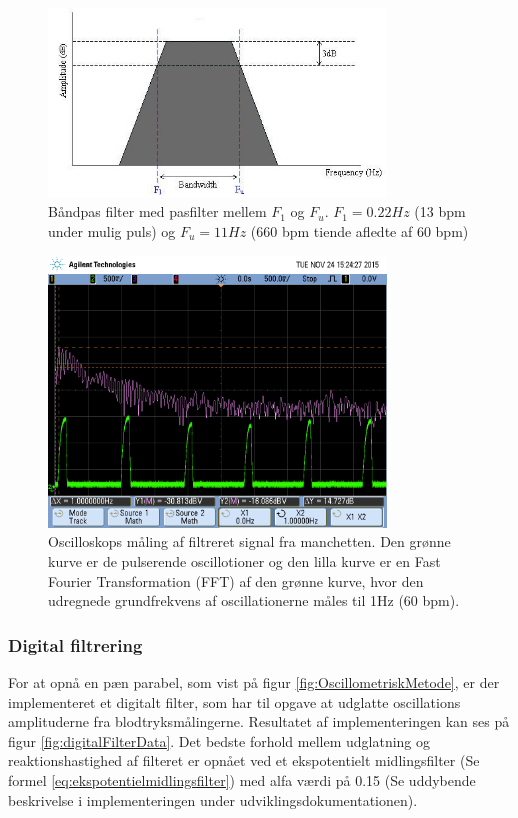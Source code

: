 \begin{figure}[H]
	\centering
	\includegraphics[trim={0 0 0 1.5cm},clip, width=0.8\textwidth]{billeder/BandPass_filter.JPG}
	\caption{Båndpas filter med pasfilter mellem $F_1$ og $F_u$. $F_1=0.22Hz$ (13 bpm under mulig puls) og $F_u=11Hz$ (660 bpm tiende afledte af 60 bpm) }\label{fig:BandPassFilter}
\end{figure}

\begin{figure}[H]
	\centering
	\includegraphics[trim={0 2.5cm 0 1.5cm},clip, width=0.8\textwidth]{billeder/filteredPulseSignalWithFFT.png}
	\caption{Oscilloskops måling af filtreret signal fra manchetten. Den grønne kurve er de pulserende oscillotioner og den lilla kurve er en Fast Fourier Transformation (FFT) af den grønne kurve, hvor den udregnede grundfrekvens af oscillationerne måles til 1Hz (60 bpm).}\label{fig:filteredPulseSignalWithFFT}
\end{figure}

\subsubsection{Digital filtrering}
For at opnå en pæn parabel, som vist på  figur \ref{fig:OscillometriskMetode}, er der implementeret et digitalt filter, som har til opgave at udglatte oscillations amplituderne fra blodtryksmålingerne. Resultatet af implementeringen kan ses på figur \ref{fig:digitalFilterData}. Det bedste forhold mellem udglatning og reaktionshastighed af filteret er opnået ved et ekspotentielt midlingsfilter (Se formel \ref{eq:ekspotentielmidlingsfilter}) med alfa værdi på 0.15 (Se uddybende beskrivelse i implementeringen under udviklingsdokumentationen).  

